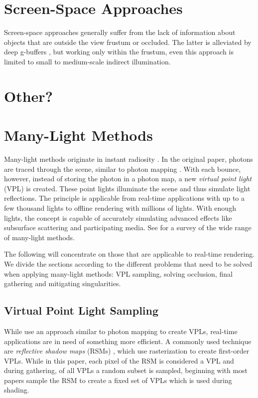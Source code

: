 \section{Screen-Space Approaches}

Screen-space approaches generally suffer from the lack of information about objects that are outside the view frustum or occluded. The latter is alleviated by deep g-buffers \citep{Mara:2014:DeepGBuffers, Mara:2016:DeepGBuffers2}, but working only within the frustum, even this approach is limited to small to medium-scale indirect illumination.


\section{Other?}


\section{Many-Light Methods}

Many-light methods originate in instant radiosity \citep{Keller:1997:InstantRadiosity}. In the original paper, photons are traced through the scene, similar to photon mapping \citep{Jensen:1996:PhotonMapping}. With each bounce, however, instead of storing the photon in a photon map, a new \emph{virtual point light} (VPL) is created. These point lights illuminate the scene and thus simulate light reflections. The principle is applicable from real-time applications with up to a few thousand lights to offline rendering with millions of lights. With enough lights, the concept is capable of accurately simulating advanced effects like subsurface scattering and participating media. See \citet{Dachsbacher:2014:ManyLightsSTAR} for a survey of the wide range of many-light methods.

The following will concentrate on those that are applicable to real-time rendering. We divide the sections according to the different problems that need to be solved when applying many-light methods: VPL sampling, solving occlusion, final gathering and mitigating singularities.

\subsection{Virtual Point Light Sampling}

While \citet{Keller:1997:InstantRadiosity} use an approach similar to photon mapping to create VPLs, real-time applications are in need of something more efficient. A commonly used technique are \emph{reflective shadow maps} (RSMs) \citep{Dachsbacher:2005:RSM}, which use rasterization to create first-order VPLs. While in this paper, each pixel of the RSM is considered a VPL and during gathering, of all VPLs a random subset is sampled, beginning with \citet{dachsbacher2006splatting} most papers sample the RSM to create a fixed set of VPLs which is used during shading.


